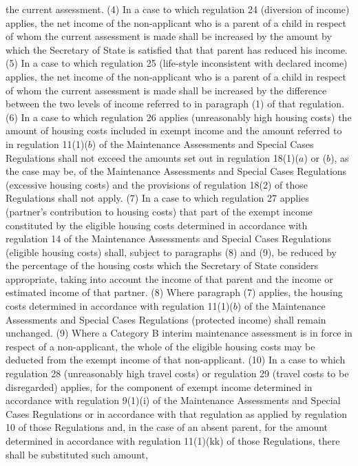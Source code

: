 \documentclass[a4paper]{article}
\begin{document}
the current assessment.
(4) In a case to which regulation 24 (diversion of income) applies, the net
income of the non-applicant who is a parent of a child in respect of whom the
current assessment is made shall be increased by the amount by which the
Secretary of State is satisfied that that parent has reduced his income.
(5) In a case to which regulation 25 (life-style inconsistent with declared
income) applies, the net income of the non-applicant who is a parent of a child
in respect of whom the current assessment is made shall be increased by the
difference between the two levels of income referred to in paragraph (1) of that
regulation.
(6) In a case to which regulation 26 applies (unreasonably high housing costs)
the amount of housing costs included in exempt income and the amount referred to
in regulation 11(1)($b$) of the Maintenance Assessments and Special Cases
Regulations shall not exceed the amounts set out in regulation 18(1)($a$) or ($b$),
as the case may be, of the Maintenance Assessments and Special Cases Regulations
(excessive housing costs) and the provisions of regulation 18(2) of those
Regulations shall not apply.
(7) In a case to which regulation 27 applies (partner’s contribution to housing
costs) that part of the exempt income constituted by the eligible housing costs
determined in accordance with regulation 14 of the Maintenance Assessments and
Special Cases Regulations (eligible housing costs) shall, subject to paragraphs
(8) and (9), be reduced by the percentage of the housing costs which the
Secretary of State considers appropriate, taking into account the income of that
parent and the income or estimated income of that partner.
(8) Where paragraph (7) applies, the housing costs determined in accordance with
regulation 11(1)($b$) of the Maintenance Assessments and Special Cases Regulations
(protected income) shall remain unchanged.
(9) Where a Category B interim maintenance assessment is in force in respect of
a non-applicant, the whole of the eligible housing costs may be deducted from
the exempt income of that non-applicant.
(10) In a case to which regulation 28 (unreasonably high travel costs) or
regulation 29 (travel costs to be disregarded) applies, for the component of
exempt income determined in accordance with regulation 9(1)(i) of the
Maintenance Assessments and Special Cases Regulations or in accordance with that
regulation as applied by regulation 10 of those Regulations and, in the case of
an absent parent, for the amount determined in accordance with regulation
11(1)(kk) of those Regulations, there shall be substituted such amount,
\end{document}
